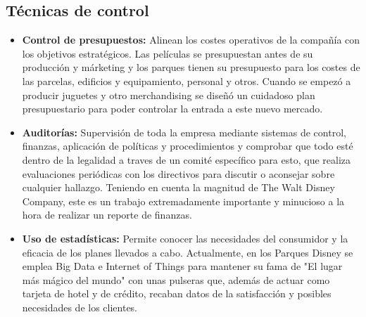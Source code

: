 \subsection{Técnicas de control}

\begin{itemize}

\item
\textbf{Control de presupuestos:} Alinean los costes operativos de la compañía con los objetivos estratégicos. Las películas se presupuestan antes de su producción y márketing y los parques tienen su presupuesto para los costes de las parcelas, edificios y equipamiento, personal y otros. Cuando se empezó a producir juguetes y otro merchandising se diseñó un cuidadoso plan presupuestario para poder controlar la entrada a este nuevo mercado.

\item
\textbf{Auditorías:} Supervisión de toda la empresa mediante sistemas de control, finanzas, aplicación de políticas y procedimientos y comprobar que todo esté dentro de la legalidad a traves de un comité específico para esto, que realiza evaluaciones periódicas con los directivos para discutir o aconsejar sobre cualquier hallazgo. Teniendo en cuenta la magnitud de The Walt Disney Company, este es un trabajo extremadamente importante y minucioso  a la hora de realizar un reporte de finanzas.

\item
\textbf{Uso de estadísticas:} Permite conocer las necesidades del consumidor y la eficacia de los planes llevados a cabo. Actualmente, en los Parques Disney se emplea Big Data e Internet of Things para mantener su fama de "El lugar más mágico del mundo" con unas pulseras que, además de actuar como tarjeta de hotel y de crédito,  recaban datos de la satisfacción y posibles necesidades de los clientes.

\end{itemize}